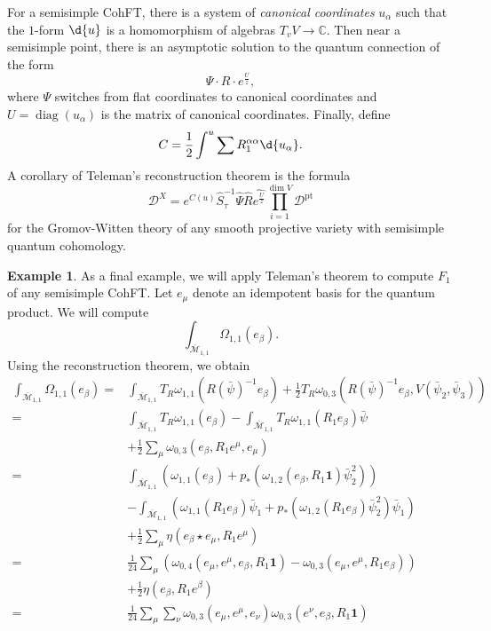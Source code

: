 \documentclass{amsart}
\theoremstyle{definition}
\newtheorem{exm}[thm]{Example}
\theoremstyle{remark}
\theoremstyle{plain}
\theoremstyle{definition}
\theoremstyle{remark}
\newcommand{\C}{\mathbb{C}}
\newcommand{\Mbar}{\overline{\mathcal{M}}}
\newcommand{\mc}[1]{\mathcal{#1}}
\newcommand{\mr}[1]{\mathrm{#1}}
\newcommand{\on}[1]{\operatorname{#1}}
\newcommand{\wh}[1]{\widehat{#1}}
\newcommand{\1}{\mathbf{1}}
\newcommand{\2}{\mathbf{2}}
\newcommand{\3}{\mathbf{3}}
\begin{document}
For a semisimple CohFT, there is a system of \textit{canonical coordinates} $u_{\alpha}$ such that the $1$-form $\d{u}$ is a homomorphism of algebras $T_v V \to \C$. Then near a semisimple point, there is an asymptotic solution to the quantum connection of the form
\[ \Psi \cdot  R \cdot e^{\frac{U}{z}}, \]
where $\Psi$ switches from flat coordinates to canonical coordinates and $U = \on{diag}(u_{\alpha})$ is the matrix of canonical coordinates. Finally, define
\[ C = \frac{1}{2} \int^u \sum R_1^{\alpha\alpha} \d{u_{\alpha}}. \]
A corollary of Teleman's reconstruction theorem is the formula
\[ \mc{D}^X = e^{C(u)} \hat{S}^{-1}_{\tau} \hat{\Psi} \hat{R} \wh{e^{\frac{U}{z}}} \prod_{i=1}^{\dim V} \mc{D}^{\mr{pt}} \]
for the Gromov-Witten theory of any smooth projective variety with semisimple quantum cohomology.

\begin{exm}
    As a final example, we will apply Teleman's theorem to compute $F_1$ of any semisimple CohFT. Let $e_{\mu}$ denote an idempotent basis for the quantum product. We will compute
    \[ \int_{\Mbar_{1,1}} \Omega_{1,1}(e_{\beta}). \]
    Using the reconstruction theorem, we obtain
    \begin{align*}
        \int_{\Mbar_{1,1}}\Omega_{1,1}(e_{\beta}) ={}& \int_{\Mbar_{1,1}} T_R \omega_{1,1}(R(\bar{\psi})^{-1} e_{\beta}) + \frac{1}{2} T_R \omega_{0,3}(R(\bar{\psi})^{-1} e_{\beta}, V(\bar{\psi}_2, \bar{\psi}_3)) \\
        ={}& \int_{\Mbar_{1,1}}T_R\omega_{1,1}(e_{\beta}) - \int_{\Mbar_{1,1}} T_R \omega_{1,1}(R_1 e_{\beta})\bar{\psi} \\ 
        &+ \frac{1}{2}\sum_{\mu}  \omega_{0,3}(e_{\beta}, R_1 e^{\mu}, e_{\mu}) \\
        ={}& \int_{\Mbar_{1,1}} ( \omega_{1,1}(e_{\beta}) + p_* ( \omega_{1,2}(e_{\beta}, R_1 \1) \bar{\psi}_2^2 )) \\
        &- \int_{\Mbar_{1,1}} (\omega_{1,1}(R_1 e_{\beta})\bar{\psi}_1 + p_* ( \omega_{1,2}(R_1 e_{\beta}) \bar{\psi}_2^2 ) \bar{\psi}_1) \\
        &+ \frac{1}{2} \sum_{\mu} \eta(e_{\beta} \star e_{\mu}, R_1 e^{\mu}) \\
        ={}& \frac{1}{24} \sum_{\mu} ( \omega_{0,4}(e_{\mu}, e^{\mu}, e_{\beta}, R_1 \1) -\omega_{0,3}(e_{\mu}, e^{\mu}, R_1 e_{\beta}) )\\
        &+ \frac{1}{2} \eta(e_{\beta}, R_1 e^{\beta}) \\
        ={}& \frac{1}{24} \sum_{\mu}\sum_{\nu} \omega_{0,3}(e_{\mu}, e^{\mu}, e_{\nu})\omega_{0,3}(e^{\nu}, e_{\beta}, R_1 \1) \\

\end{align*}
\end{exm}
\end{document}
